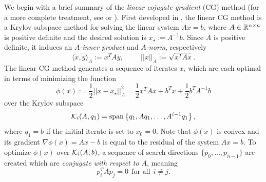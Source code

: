 \begin{enumerate}
We begin with a brief summary of the \textit{linear cojugate gradient} (CG) method (for a more complete treatment, see \cite[Section 11.3]{golub2012matrix} or \cite[Chapter 5]{nocedal2006numerical}).  First developed in \cite{hestenes1952methods}, the linear CG method is a Krylov subspace method for solving the linear system $Ax = b$, where $A \in {\mathbb R}^{n \times n}$ is positive definite and the desired solution is $x_\star := A^{-1}b$.  Since $A$ is positive definite, it induces an \textit{$A$-inner product} and \textit{$A$-norm}, respectively
\begin{equation} 		\label{Eqn:conjugate_inner_product_norm}
\langle x, y \rangle_A := x^TAy, \hspace{1cm} ||x||_A := \sqrt{x^TAx}.
\end{equation}
The linear CG method generates a sequence of iterates $x_i$ which are each optimal in terms of minimizing the function 
\begin{equation}   			\label{Eqn:CG_linear_function}
\phi(x) := \frac{1}{2}||x - x_\star||_A^2 = \frac{1}{2}x^TAx + b^Tx + \frac{1}{2}b^TA^{-1}b
\end{equation}
over the Krylov subspace
\begin{equation}   			\label{Eqn:CG_linear_krylov_subspace}
{\mathcal K}_i(A,q_1) = \text{span} \left\{q_1, Aq_1, \ldots, A^{i-1}q_1 \right\},
\end{equation}
where $q_1 = b$ if the initial iterate is set to $x_0 = 0$.  Note that $\phi(x)$ is convex and its gradient $\nabla \phi(x) = Ax-b$ is equal to the residual of the system $Ax=b$.  To optimize $\phi(x)$ over ${\mathcal K}_i(A,b)$, a sequence of search directions $\{p_0, \ldots, p_{n-1}\}$ are created which are \textit{conjugate with respect to $A$}, meaning
\begin{equation} 				\label{Eqn:CG_conj_vectors}
p_i^TAp_j = 0 \ \ \text{for all} \ \ i \neq j.
\end{equation}



\end{enumerate}

